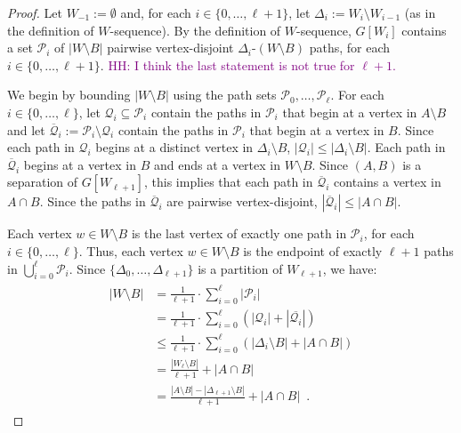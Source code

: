 \documentclass{patmorin}
\newcommand{\hussein}[1]{\textcolor{purple}{HH: #1}}
\begin{document}
\begin{proof}
  Let $W_{-1}:=\emptyset$ and, for each $i\in\{0,\ldots,\ell+1\}$, let $\Delta_{i}:=W_{i}\setminus W_{i-1}$ (as in the definition of $W$-sequence).
  By the definition of $W$-sequence, $G[W_{i}]$ contains a set $\mathcal{P}_i$ of $|W\setminus B|$ pairwise vertex-disjoint $\Delta_i$-$(W\setminus B)$ paths, for each $i\in\{0,\ldots,\ell+1\}$.  \hussein{I think the last statement is not true for $\ell + 1$.}

  We begin by bounding $|W\setminus B|$ using the path sets $\mathcal{P}_0,\ldots,\mathcal{P}_{\ell}$.  For each $i\in\{0,\ldots,\ell\}$, let $\mathcal{Q}_i\subseteq \mathcal{P}_i$ contain the paths in $\mathcal{P}_i$ that begin at a vertex in $A\setminus B$ and let $\overline{\mathcal{Q}}_i:=\mathcal{P}_i\setminus \mathcal{Q}_i$ contain the paths in $\mathcal{P}_i$ that begin at a vertex in $B$.  Since each path in $\mathcal{Q}_i$ begins at a distinct vertex in $\Delta_i\setminus B$, $|\mathcal{Q}_i|\le|\Delta_i\setminus B|$. Each path in $\overline{\mathcal{Q}}_i$ begins at a vertex in $B$ and ends at a vertex in $W\setminus B$. Since $(A,B)$ is a separation of $G[W_{\ell+1}]$, this implies that each path in $\overline{\mathcal{Q}}_i$ contains a vertex in $A\cap B$.  Since the paths in $\overline{\mathcal{Q}}_i$ are pairwise vertex-disjoint, $|\overline{\mathcal{Q}}_i|\le |A\cap B|$.

  Each vertex $w\in W\setminus B$ is the last vertex of exactly one path in $\mathcal{P}_i$, for each $i\in\{0,\ldots,\ell\}$. Thus, each vertex $w\in W\setminus B$ is the endpoint of exactly $\ell+1$ paths in $\bigcup_{i=0}^\ell\mathcal{P}_i$.  Since $\{\Delta_0,\ldots,\Delta_{\ell+1}\}$ is a partition of $W_{\ell+1}$, we have:
  \begin{align}
  \begin{split}
    |W\setminus B|
      & = \frac{1}{\ell+1}\cdot\sum_{i=0}^{\ell}|\mathcal{P}_i| \\
      & = \frac{1}{\ell+1}\cdot\sum_{i=0}^{\ell}\left(|\mathcal{Q}_i|+|\overline{\mathcal{Q}_i}|\right) \\
      & \le \frac{1}{\ell+1}\cdot\sum_{i=0}^{\ell}\left(|\Delta_i\setminus B|+|A\cap B|\right) \\
      & = \frac{|W_\ell\setminus B|}{\ell+1} + |A\cap B| \\
      & = \frac{|A\setminus B|-|\Delta_{\ell+1}\setminus B|}{\ell+1} + |A\cap B| \enspace .  \label{w_b_bound}
  \end{split}
  \end{align}


\end{proof}
\end{document}
